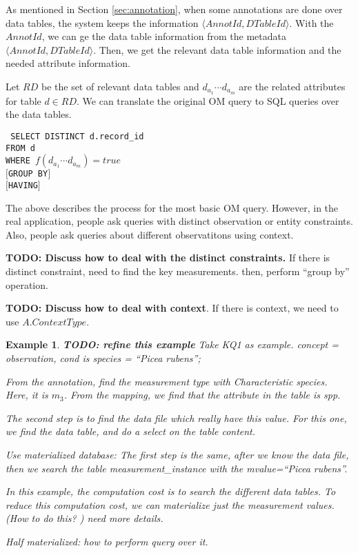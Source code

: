 \documentclass[conference]{IEEEtran}
\newtheorem{example}{Example}[section]
\begin{document}
As mentioned in Section \ref{sec:annotation}, when some annotations are done over data tables, the system keeps the
information $\langle AnnotId, DTableId\rangle$. 
With the $AnnotId$, we can ge the data table information from the
metadata  $\langle AnnotId, DTableId\rangle$. 
Then, we get the relevant data table information and the needed attribute
information.

Let $RD$ be the set of relevant data tables and $d_{a_1} \cdots d_{a_m}$
are the related attributes for table $d\in RD$. We can translate the original OM query to SQL queries
over the data tables.  

{\tt 
SELECT DISTINCT d.record\_id\\
FROM d\\
WHERE $f(d_{a_1} \cdots d_{a_m}) = true$\\
$[$GROUP BY$]$\\
$[$HAVING$]$
}

The above describes the process for the most basic OM query. 
However, in the real application, people ask queries with distinct
observation or entity constraints. Also, people ask queries about
different observatitons using context. 

{\bf TODO: Discuss how to deal with the distinct constraints. }
If there is distinct constraint, need to find the key measurements. 
then, perform ``group by'' operation. 

{\bf TODO: Discuss how to deal with context}. 
If there is context, we need to use $A.ContextType$. 


\begin{example}
{\bf TODO: refine this example}
Take KQ1 as example. 
concept = observation, cond is {\em species = ``Picea rubens''}; 

From the annotation, find the {\em measurement type} with {\em
  Characteristic} species. 
Here, it is $m_3$. From the mapping, we find that the attribute in the
table is {\em spp}. 


The second step is to find the data file which really have this
value. 
For this one, we find the data table, and do a select on the table
content. 

Use materialized database: 
The first step is the same, after we know the data file, then we
search the table {\em measurement\_instance} with the {\em mvalue=``Picea rubens''}. 

In this example, the computation cost is to search the different data
tables. To reduce this computation cost, we can materialize just the
measurement values. (How to do this? ) need more details. 

Half materialized: how to perform query over it. 
\end{example}
\end{document}
